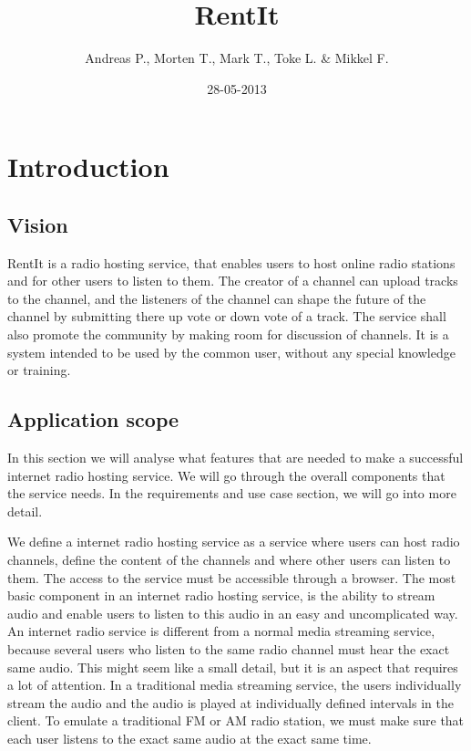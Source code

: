 \documentclass[a4paper,11pt,report]{article}
\begin{document}
\title{RentIt}
\author{Andreas P., Morten T., Mark T., Toke L. \& Mikkel F.}
\date{28-05-2013}
\maketitle

\section{Introduction}
\subsection{Vision}
RentIt is a radio hosting service, that enables users to host online radio stations and for other users to listen to them. The creator of a channel can upload tracks to the channel, and the listeners of the channel can shape the future of the channel by submitting there up vote or down vote of a track. The service shall also promote the community by making room for discussion of channels.
It is a system intended to be used by the common user, without any special knowledge or training.

\subsection{Application scope}
In this section we will analyse what features that are needed to make a successful internet radio hosting service. We will go through the overall components that the service needs. In the requirements and use case section, we will go into more detail.

We define a internet radio hosting service as a service where users can host radio channels, define the content of the channels and where other users can listen to them. The access to the service must be accessible through a browser. The most basic component in an internet radio hosting service, is the ability to stream audio and enable users to listen to this audio in an easy and uncomplicated way. An internet radio service is different from a normal media streaming service, because several users who listen to the same radio channel must hear the exact same audio. This might seem like a small detail, but it is an aspect that requires a lot of attention. In a traditional media streaming service, the users individually stream the audio and the audio is played at individually defined intervals in the client. To emulate a traditional FM or AM radio station, we must make sure that each user listens to the exact same audio at the exact same time. 
\end{document}
